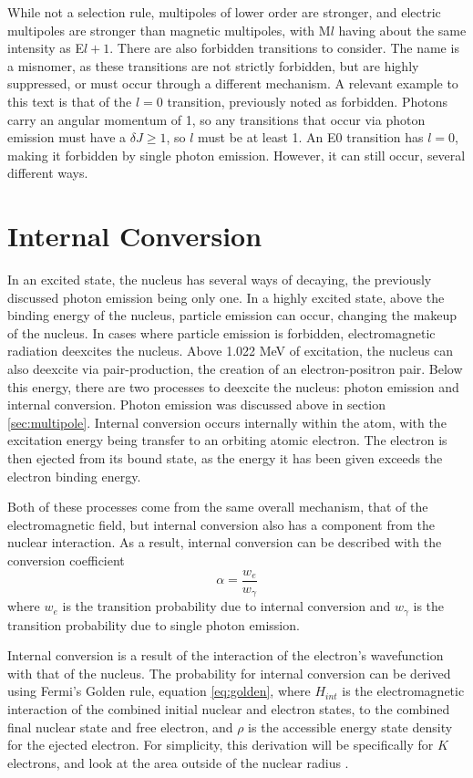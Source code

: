 While not a selection rule, multipoles of lower order are stronger, and electric multipoles are stronger than magnetic multipoles, with M$l$ having about the same intensity as E$l+1$. There are also forbidden transitions to consider. The name is a misnomer, as these transitions are not strictly forbidden, but are highly suppressed, or must occur through a different mechanism. A relevant example to this text is that of the $l=0$ transition, previously noted as forbidden. Photons carry an angular momentum of 1, so any transitions that occur via photon emission must have a $\delta J \geq 1$, so $l$ must be at least 1. An E0 transition has $l=0$, making it forbidden by single photon emission. However, it can still occur, several different ways.

\section{Internal Conversion}

In an excited state, the nucleus has several ways of decaying, the previously discussed photon emission being only one. In a highly excited state, above the binding energy of the nucleus, particle emission can occur, changing the makeup of the nucleus. In cases where particle emission is forbidden, electromagnetic radiation deexcites the nucleus. Above 1.022 MeV of excitation, the nucleus can also deexcite via pair-production, the creation of an electron-positron pair. Below this energy, there are two processes to deexcite the nucleus: photon emission and internal conversion. Photon emission was discussed above in section \ref{sec:multipole}. Internal conversion occurs internally within the atom, with the excitation energy being transfer to an orbiting atomic electron. The electron is then ejected from its bound state, as the energy it has been given exceeds the electron binding energy. 

Both of these processes come from the same overall mechanism, that of the electromagnetic field, but internal conversion also has a component from the nuclear interaction. As a result, internal conversion can be described with the conversion coefficient
\begin{equation}
\label{eq:conv_coeff}
    \alpha = \frac{w_e}{w_\gamma}
\end{equation}
where $w_e$ is the transition probability due to internal conversion and $w_\gamma$ is the transition probability due to single photon emission.

Internal conversion is a result of the interaction of the electron's wavefunction with that of the nucleus. The probability for internal conversion can be derived using Fermi's Golden rule, equation \ref{eq:golden}, where $H_{int}$ is the electromagnetic interaction of the combined initial nuclear and electron states, to the combined final nuclear state and free electron, and $\rho$ is the accessible energy state density for the ejected electron. For simplicity, this derivation will be specifically for $K$ electrons, and look at the area outside of the nuclear radius \citep{roy67:_e0, blatt79:_emradiation, segre77:_icradiation}.

